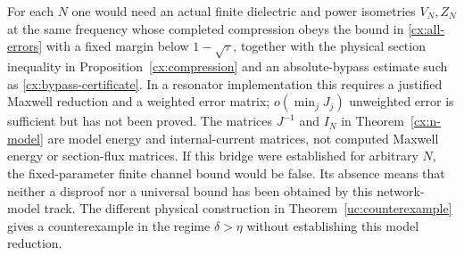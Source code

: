 \begin{remark}
\label{cx:missing-bridge}
For each $N$ one would need an actual finite dielectric and power
isometries $V_N,Z_N$ at the same frequency whose completed compression
obeys the bound in \eqref{cx:all-errors} with a fixed margin below
$1-\sqrt\tau$, together with the physical section inequality in
Proposition~\ref{cx:compression} and an absolute-bypass estimate such
as \eqref{cx:bypass-certificate}. In a resonator implementation this
requires a justified Maxwell reduction and a weighted error matrix;
$o(\min_jJ_j)$ unweighted error is sufficient but has not been proved.
The matrices $J^{-1}$ and $I_N$ in Theorem~\ref{cx:n-model} are model
energy and internal-current matrices, not computed Maxwell energy or
section-flux matrices. If this bridge were established for arbitrary
$N$, the fixed-parameter finite channel bound would be false. Its
absence means that neither a disproof nor a universal bound has been
obtained by this network-model track. The different physical construction
in Theorem~\ref{uc:counterexample} gives a counterexample in the regime
$\delta>\eta$ without establishing this model reduction.
\end{remark}
